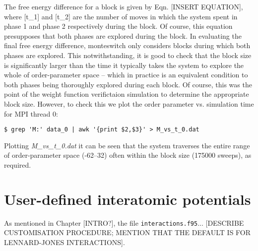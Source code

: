 \documentclass{report}
\begin{document}
The free energy difference for a block is given by Eqn. [INSERT EQUATION], where [t\_1] and [t\_2] are the number of moves in which the system spent in
phase 1 and phase 2 respectively during the block. Of course, this equation presupposes that both phases are explored during the block. In evaluating the
final free energy difference, monteswitch only considers blocks during which both phases are explored. This notwithstanding, it is good to check that
the block size is significantly larger than the time it typically takes the system to explore the whole of order-parameter space -- which in practice
is an equivalent condition to both phases being thoroughly explored during each block. Of course, this was the point of the weight function verifictaion
simulation to determine the appropriate block size. However, to check this we plot the order parameter vs. simulation time for MPI thread 0:
\begin{verbatim}
$ grep 'M:' data_0 | awk '{print $2,$3}' > M_vs_t_0.dat
\end{verbatim}
Plotting \emph{M\_vs\_t\_0.dat} it can be seen that the system traverses the entire range of order-parameter space (-62--32) often within the block size 
(175000 sweeps), as required.


\chapter{User-defined interatomic potentials}\label{chapter:interactions}
As mentioned in Chapter [INTRO?], the file \texttt{interactions.f95}... [DESCRIBE CUSTOMISATION PROCEDURE; MENTION THAT THE DEFAULT IS
FOR LENNARD-JONES INTERACTIONS].






\appendix



\end{document}
